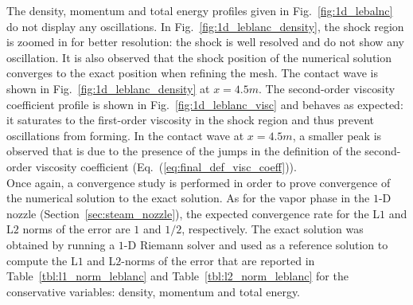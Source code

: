\documentclass[preprint,10pt]{elsarticle}
\newcommand{\eqt}[1]{Eq.~(\ref{#1})}                     %
\newcommand{\fig}[1]{Fig.~\ref{#1}}                      %
\newcommand{\tbl}[1]{Table~\ref{#1}}                     %
\newcommand{\sct}[1]{Section~\ref{#1}}                   %
\begin{document}
 The density, momentum and total energy profiles given in \fig{fig:1d_lebalnc} do not display any oscillations. In \fig{fig:1d_leblanc_density}, the shock region is zoomed in for better resolution: the shock is well resolved and do not show any oscillation. It is also observed that the shock position of the numerical solution converges to the exact position when refining the mesh. The contact wave is shown in \fig{fig:1d_leblanc_density} at $x=4.5m$. The second-order viscosity coefficient profile is shown in \fig{fig:1d_leblanc_visc} and behaves as expected: it saturates to the first-order viscosity in the shock region and thus prevent oscillations from forming. In the contact wave at $x=4.5m$, a smaller peak is observed that is due to the presence of the jumps in the definition of the second-order viscosity coefficient (\eqt{eq:final_def_visc_coeff}).  \\
Once again, a convergence study is performed in order to prove convergence of the numerical solution to the exact solution. As for the vapor phase in the $1$-D nozzle (\sct{sec:steam_nozzle}), the expected convergence rate for the L$1$ and L$2$ norms of the error are $1$ and $1/2$, respectively. The exact solution was obtained by running a $1$-D Riemann solver and used as a reference solution to compute the L$1$ and L$2$-norms of the error that are reported in \tbl{tbl:l1_norm_leblanc} and \tbl{tbl:l2_norm_leblanc} for the conservative variables: density, momentum and total energy.
\end{document}
